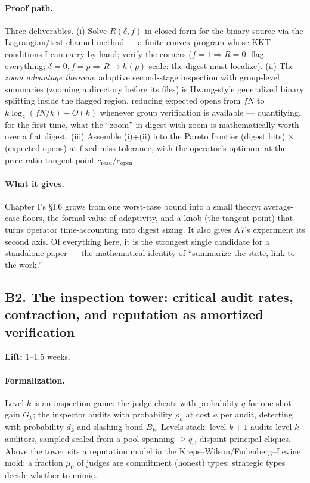 \documentclass[11pt,a4paper]{article}
\newcommand{\lift}[1]{\noindent\textbf{Lift:} #1.}
\newcommand{\gives}{\paragraph{What it gives.}}
\newcommand{\form}{\paragraph{Formalization.}}
\newcommand{\proofpath}{\paragraph{Proof path.}}
\begin{document}
\proofpath Three deliverables. (i) Solve $R(\delta,f)$ in closed form for the binary source via the Lagrangian/test-channel method --- a finite convex program whose KKT conditions I can carry by hand; verify the corners ($f{=}1 \Rightarrow R{=}0$: flag everything; $\delta{=}0, f{=}p \Rightarrow R \to h(p)$-scale: the digest must localize). (ii) The \emph{zoom advantage theorem}: adaptive second-stage inspection with group-level summaries (zooming a directory before its files) is Hwang-style generalized binary splitting inside the flagged region, reducing expected opens from $fN$ to $k\log_2(fN/k) + O(k)$ whenever group verification is available --- quantifying, for the first time, what the ``zoom'' in digest-with-zoom is mathematically worth over a flat digest. (iii) Assemble (i)+(ii) into the Pareto frontier (digest bits) $\times$ (expected opens) at fixed miss tolerance, with the operator's optimum at the price-ratio tangent point $c_{\mathrm{read}}/c_{\mathrm{open}}$.

\gives Chapter I's \S I.6 grows from one worst-case bound into a small theory: average-case floors, the formal value of adaptivity, and a knob (the tangent point) that turns operator time-accounting into digest sizing. It also gives A7's experiment its second axis. Of everything here, it is the strongest single candidate for a standalone paper --- the mathematical identity of ``summarize the state, link to the work.''

\subsection{B2. The inspection tower: critical audit rates, contraction, and reputation as amortized verification}
\lift{1--1.5 weeks}

\form Level $k$ is an inspection game: the judge cheats with probability $q$ for one-shot gain $G_k$; the inspector audits with probability $\rho_k$ at cost $a$ per audit, detecting with probability $d_k$ and slashing bond $B_k$. Levels stack: level $k{+}1$ audits level-$k$ auditors, sampled sealed from a pool spanning $\ge q_{\mathrm{cl}}$ disjoint principal-cliques. Above the tower sits a reputation model in the Kreps--Wilson/Fudenberg--Levine mold: a fraction $\mu_0$ of judges are commitment (honest) types; strategic types decide whether to mimic.
\end{document}
